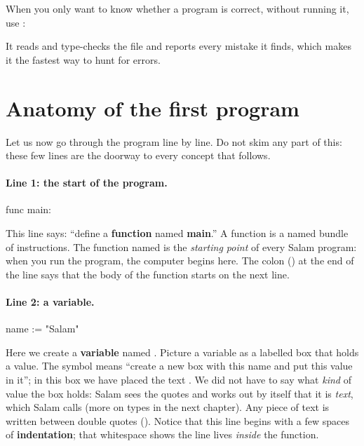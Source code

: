 \begin{tip}
When you only want to know whether a program is correct, without running it,
use :
It reads and type-checks the file and reports every mistake it finds, which
makes it the fastest way to hunt for errors.
\end{tip}

\section{Anatomy of the first program}

Let us now go through the program line by line. Do not skim any part of this:
these few lines are the doorway to every concept that follows.

\paragraph{Line 1: the start of the program.}
\begin{salamen}
func main:
\end{salamen}
This line says: ``define a \textbf{function} named \textbf{main}.'' A function is
a named bundle of instructions. The function named  is the
\emph{starting point} of every Salam program: when you run the program, the
computer begins here. The colon (\code{:}) at the end of the line says that the
body of the function starts on the next line.

\paragraph{Line 2: a variable.}
\begin{salamen}
    name := "Salam"
\end{salamen}
Here we create a \textbf{variable} named . Picture a variable as a
labelled box that holds a value. The symbol \code{:=} means ``create a new box
with this name and put this value in it''; in this box we have placed the text
. We did not have to say what \emph{kind} of value the box holds:
Salam sees the quotes and works out by itself that it is \emph{text}, which
Salam calls  (more on types in the next chapter). Any piece of text is written between double
quotes (). Notice that this line begins with a few spaces of
\textbf{indentation}; that whitespace shows the line lives \emph{inside} the
 function.

